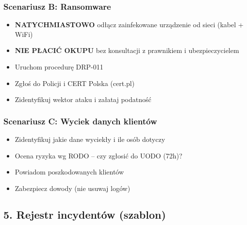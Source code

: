 \documentclass[12pt,a4paper]{article}
\providecommand{\tightlist}{\setlength{\itemsep}{0pt}\setlength{\parskip}{0pt}}
\begin{document}
\subsubsection{Scenariusz B:
Ransomware}\label{scenariusz-b-ransomware}

\begin{itemize}
\tightlist
\item
  \textbf{NATYCHMIASTOWO} odłącz zainfekowane urządzenie od sieci (kabel
  + WiFi)
\item
  \textbf{NIE PŁACIĆ OKUPU} bez konsultacji z prawnikiem i
  ubezpieczycielem
\item
  Uruchom procedurę DRP-011
\item
  Zgłoś do Policji i CERT Polska (cert.pl)
\item
  Zidentyfikuj wektor ataku i załataj podatność
\end{itemize}

\subsubsection{Scenariusz C: Wyciek danych
klientów}\label{scenariusz-c-wyciek-danych-klientuxf3w}

\begin{itemize}
\tightlist
\item
  Zidentyfikuj jakie dane wyciekły i ile osób dotyczy
\item
  Ocena ryzyka wg RODO -- czy zgłosić do UODO (72h)?
\item
  Powiadom poszkodowanych klientów
\item
  Zabezpiecz dowody (nie usuwaj logów)
\end{itemize}

\subsection{5. Rejestr incydentów
(szablon)}\label{rejestr-incydentuxf3w-szablon}
\end{document}
